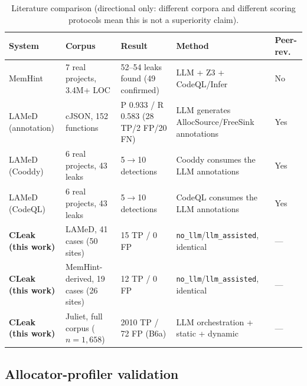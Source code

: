 \documentclass[11pt,a4paper]{article}
\begin{document}
\begin{table}[htbp]
\centering
\caption{Literature comparison (directional only: different corpora and
different scoring protocols mean this is not a superiority claim).}
\label{tab:literature}
\small
\begin{tabular}{@{}p{2.1cm}p{3.6cm}p{3.7cm}p{2.4cm}p{1.3cm}@{}}
\toprule
\textbf{System} & \textbf{Corpus} & \textbf{Result} & \textbf{Method} & \textbf{Peer-rev.} \\
\midrule
MemHint~\cite{memhint} & 7 real projects, 3.4M+ LOC & 52--54 leaks found (49 confirmed) & LLM + Z3 + CodeQL/Infer & No \\
LAMeD~\cite{lamed} (annotation) & cJSON, 152 functions & P 0.933 / R 0.583 (28 TP/2 FP/20 FN) & LLM generates AllocSource/FreeSink annotations & Yes \\
LAMeD~\cite{lamed} (Cooddy) & 6 real projects, 43 leaks & 5$\to$10 detections & Cooddy consumes the LLM annotations & Yes \\
LAMeD~\cite{lamed} (CodeQL) & 6 real projects, 43 leaks & 5$\to$10 detections & CodeQL consumes the LLM annotations & Yes \\
\textbf{CLeak (this work)} & LAMeD, 41 cases (50 sites) & 15 TP / 0 FP & \texttt{no\_llm}/\texttt{llm\_assisted}, identical & --- \\
\textbf{CLeak (this work)} & MemHint-derived, 19 cases (26 sites) & 12 TP / 0 FP & \texttt{no\_llm}/\texttt{llm\_assisted}, identical & --- \\
\textbf{CLeak (this work)} & Juliet, full corpus ($n{=}1{,}658$) & 2010 TP / 72 FP (B6a) & LLM orchestration + static + dynamic & --- \\
\bottomrule
\end{tabular}
\end{table}

\subsection{Allocator-profiler validation}
\end{document}
